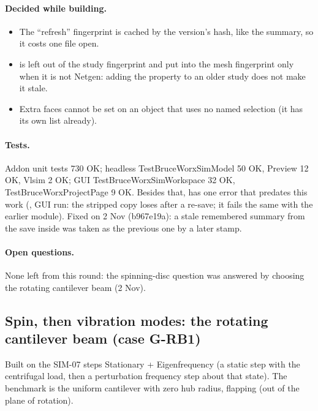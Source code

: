 \paragraph{Decided while building.}
\begin{itemize}[nosep]
  \item The ``refresh'' fingerprint is cached by the version's hash, like the summary, so it costs one file open.
  \item {} is left out of the study fingerprint and put into the mesh fingerprint only when it is not
        Netgen: adding the property to an older study does not make it stale.
  \item Extra faces cannot be set on an object that uses no named selection (it has its own list already).
\end{itemize}

\paragraph{Tests.} Addon unit tests 730 OK; headless TestBruceWorxSimModel 50 OK, Preview 12 OK, Vlsim 2 OK; GUI TestBruceWorxSimWorkspace 32 OK, TestBruceWorxProjectPage 9 OK. Besides that,  has one error that
predates this work (, GUI run: the stripped copy loses
 after a re-save; it fails the same with the earlier module). Fixed on 2 Nov (b967e19a): a stale
remembered summary from the save inside  was taken as the previous one by a later stamp.

\paragraph{Open questions.} None left from this round: the spinning-disc question was answered by choosing the
rotating cantilever beam (2 Nov).

\subsection*{Spin, then vibration modes: the rotating cantilever beam (case G-RB1)}

Built on the SIM-07 steps Stationary + Eigenfrequency (a static step with the centrifugal load, then a perturbation
frequency step about that state). The benchmark is the uniform cantilever with zero hub radius, flapping (out of the
plane of rotation).

